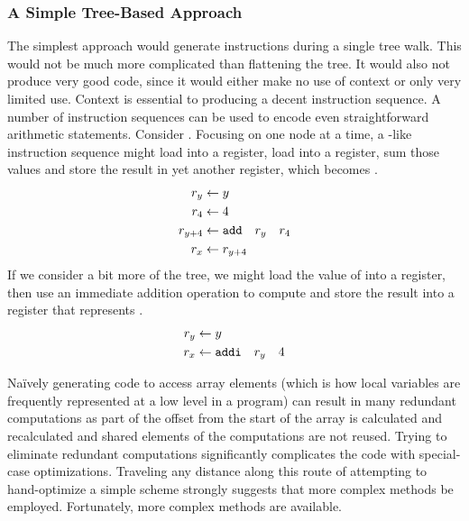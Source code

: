 \subsubsection{A Simple Tree-Based Approach}
The simplest approach would generate instructions during a single tree walk. This would not be much more complicated than flattening the tree. It would also not produce very good code, since it would either make no use of context or only very limited use. Context is essential to producing a decent instruction sequence. A number of instruction sequences can be used to encode even straightforward arithmetic statements. Consider . %
Focusing on one node at a time, a \RISC{}-like instruction sequence might load  into a register, load  into a register, sum those values and store the result in yet another register, which becomes . %
\begin{align*}
r_{y} &\gets y\\
r_{4} &\gets 4\\
r_{y + 4} &\gets \text{\texttt{add}}\quad r_{y}\quad r_{4}\\
r_{x} &\gets r_{y + 4}
\end{align*}
If we consider a bit more of the tree, we might load the value of  into a register, then use an immediate addition operation to compute  and store the result into a register that represents .
\begin{align*}
r_{y} &\gets y\\
r_{x} &\gets \text{\texttt{addi}}\quad r_{y}\quad 4
\end{align*}

Na\"ively generating code to access array elements (which is how local variables are frequently represented at a low level in a program) can result in many redundant computations as part of the offset from the start of the array is calculated and recalculated and shared elements of the computations are not reused. Trying to eliminate redundant computations significantly complicates the code with special-case optimizations. Traveling any distance along this route of attempting to hand-optimize a simple scheme strongly suggests that more complex methods be employed. Fortunately, more complex methods are available.

